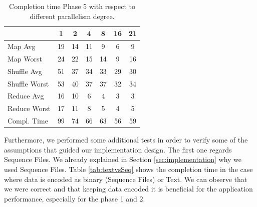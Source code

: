 \begin{table}[h!]
\begin{center}
\begin{tabular}{ | l || c | c | c | c |  c | c | }

  \hline      
   						& 1 		& 2 		& 4 		& 8 		&16 		& 21 \\
  \hline      \hline
  Map Avg 		& 19 	& 14 	& 11 	& 9 		& 6 		& 9   \\
  Map Worst 		& 24 	& 22 	& 15		& 14 	& 9 		& 16  	\\
  \hline
  Shuffle Avg 	& 51 	& 37 	& 34 	& 33 	& 29 	& 30   \\ 
  Shuffle Worst 	& 53 	& 40 	& 37 	& 37 	& 32 	& 34   \\
  \hline
  Reduce Avg	& 16 	& 10 	& 6 		& 4 		& 3 		& 3     \\
  Reduce Worst	& 17 	& 11 	& 8 		& 5 		& 4 		& 5     \\
  \hline  
  Compl. Time &	99	&	74	&	66	&	63	&	56	&	59	\\
  \hline


\end{tabular} 
  \end{center}
  \caption{Completion time Phase 5 with respect to different parallelism degree.}
    \label{tab:Phase 5}
\end{table}






Furthermore, we performed some additional tests in order to verify some of the assumptions that guided our implementation design. 
The first one regards Sequence Files.
We already explained in Section \ref{sec:implementation} why we used Sequence Files. 
Table \ref{tab:textvsSeq} shows the completion time in the case where data is encoded as binary (Sequence Files) or Text. 
We can observe that we were correct and that keeping data encoded it is beneficial for the application performance, especially for the phase 1 and 2.

